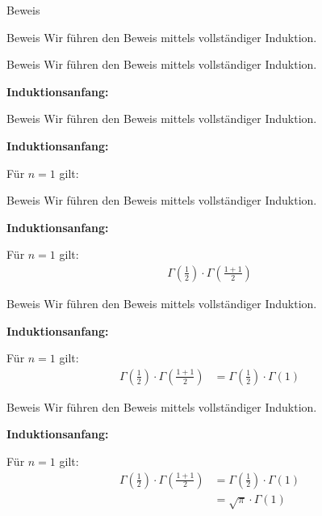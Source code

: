 \documentclass[10pt]{beamer}
\begin{document}
\begin{frame}{Beweis}
 
\end{frame}



\begin{frame}{Beweis}
    Wir führen den Beweis mittels vollständiger Induktion. 
\end{frame}



\begin{frame}{Beweis}
    Wir führen den Beweis mittels vollständiger Induktion.

    \textbf{Induktionsanfang:}
\end{frame}



\begin{frame}{Beweis}
    Wir führen den Beweis mittels vollständiger Induktion.

    \textbf{Induktionsanfang:}

    Für \( n = 1 \) gilt:
\end{frame}



\begin{frame}{Beweis}
    Wir führen den Beweis mittels vollständiger Induktion.

    \textbf{Induktionsanfang:}

    Für \( n = 1 \) gilt:
    \begin{align*}
        \Gamma\left( \frac{1}{2} \right) \cdot \Gamma\left( \frac{1 + 1}{2} \right)
    \end{align*}
\end{frame}



\begin{frame}{Beweis}
    Wir führen den Beweis mittels vollständiger Induktion.

    \textbf{Induktionsanfang:}

    Für \( n = 1 \) gilt:
    \begin{align*}
        \Gamma\left( \frac{1}{2} \right) \cdot \Gamma\left( \frac{1 + 1}{2} \right)
        & = \Gamma\left( \frac{1}{2} \right) \cdot \Gamma\left( 1 \right) 
    \end{align*}
\end{frame}



\begin{frame}{Beweis}
    Wir führen den Beweis mittels vollständiger Induktion.

    \textbf{Induktionsanfang:}

    Für \( n = 1 \) gilt:
    \begin{align*}
        \Gamma\left( \frac{1}{2} \right) \cdot \Gamma\left( \frac{1 + 1}{2} \right)
        & = \Gamma\left( \frac{1}{2} \right) \cdot \Gamma\left( 1 \right) \\
        & = \sqrt{\pi} \cdot \Gamma\left( 1 \right) 
    \end{align*}
\end{frame}
\end{document}

